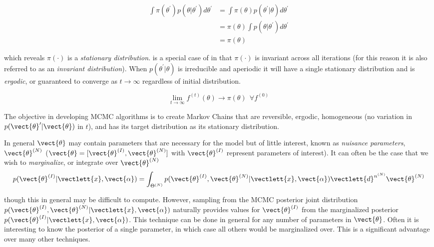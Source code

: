 \begin{equation}
\begin{aligned}
\int \pi (\theta^{\prime}) p(\theta|\theta^{\prime}) d\theta^{\prime} &=
\int \pi (\theta) p(\theta^{\prime}|\theta) d\theta^{\prime} \\
&= \pi (\theta) \int p(\theta|\theta^{\prime}) d\theta^{\prime} \\
&= \pi (\theta)
\end{aligned}
\label{eq:er_nr_calibrations_parameter_determ_mcmc_stationary}
\end{equation}

\noindent which reveals $\pi (\cdot)$ is a
\textit{stationary distribution}.   is a special case of
 in that $\pi( \cdot )$ is invariant across all iterations (for this reason
it is also referred to as an \textit{invariant distribution}).  When $p(\theta^{\prime}|\theta)$ is irreducible and
aperiodic it will have a single stationary distribution and is \textit{ergodic}, or guaranteed to converge as
$t \rightarrow \infty$ regardless of initial distribution.

\begin{equation}
\lim_{t \rightarrow \infty} f^{(t)}(\theta) \rightarrow \pi (\theta)\ \ \forall f^{(0)}
\end{equation}

The objective in developing MCMC algorithms is to create Markov Chains that are reversible, ergodic, homogeneous
(no variation in $p(\vect{\theta}^{\prime}|\vect{\theta})$ in $t$), and has its target distribution as its stationary distribution.

In general $\vect{\theta}$ may contain parameters that are necessary for the model but of little interest,
known as \textit{nuisance parameters}, $\vect{\theta}^{(N)}$ ($\vect{\theta} = [\vect{\theta}^{(I)}, \vect{\theta}^{(N)}]$ with
$\vect{\theta}^{(I)}$ represent parameters of interest).  It can often be the case that we wish to \textit{marginalize}, or integrate
over $\vect{\theta}^{(N)}$
\begin{equation}
p(\vect{\theta}^{(I)}|\vectlett{x}, \vect{\alpha}) = \int_{\Theta^{(N)}}
p(\vect{\theta}^{(I)}, \vect{\theta}^{(N)}|\vectlett{x}, \vect{\alpha}) \vectlett{d}^{n^{(N)}}\vect{\theta}^{(N)}
\end{equation}

\noindent though this in general may be difficult to compute.  However, sampling from the MCMC posterior joint distribution
$p(\vect{\theta}^{(I)}, \vect{\theta}^{(N)}|\vectlett{x}, \vect{\alpha})$ naturally provides values for $\vect{\theta}^{(I)}$ from the
marginalized posterior $p(\vect{\theta}^{(I)}|\vectlett{x}, \vect{\alpha})$.  This technique can be done in general for any number of
parameters in $\vect{\theta}$.  Often it is interesting to know the posterior of a single parameter, in which case all others would
be marginalized over.  This is a significant advantage over many other techniques.

